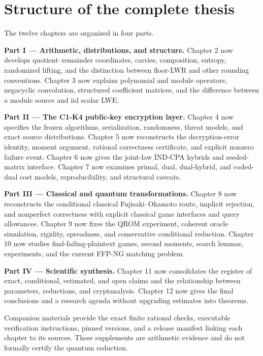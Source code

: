 \documentclass[
  11pt,
  a4paper,
  oneside]{report}
\begin{document}
\section{Structure of the complete
thesis}\label{structure-of-the-complete-thesis}

The twelve chapters are organized in four parts.

\textbf{Part I --- Arithmetic, distributions, and structure.} Chapter 2
now develops quotient--remainder coordinates, carries, composition,
entropy, randomized lifting, and the distinction between floor-LWR and
other rounding conventions. Chapter 3 now explains polynomial and module
operators, negacyclic convolution, structured coefficient matrices, and
the difference between a module source and iid scalar LWE.

\textbf{Part II --- The C1-K4 public-key encryption layer.} Chapter 4
now specifies the frozen algorithms, serialization, randomness, threat
models, and exact source distributions. Chapter 5 now reconstructs the
decryption-error identity, moment argument, rational correctness
certificate, and explicit nonzero failure event. Chapter 6 now gives the
joint-law IND-CPA hybrids and seeded-matrix interface. Chapter 7 now
examines primal, dual, dual-hybrid, and coded-dual cost models,
reproducibility, and structural caveats.

\textbf{Part III --- Classical and quantum transformations.} Chapter 8
now reconstructs the conditional classical Fujisaki--Okamoto route,
implicit rejection, and nonperfect correctness with explicit classical
game interfaces and query allowances. Chapter 9 now fixes the QROM
experiment, coherent oracle simulation, rigidity, spreadness, and
conservative conditional reduction. Chapter 10 now studies
find-failing-plaintext games, second moments, search lemmas,
experiments, and the current FFP-NG matching problem.

\textbf{Part IV --- Scientific synthesis.} Chapter 11 now consolidates
the register of exact, conditional, estimated, and open claims and the
relationship between parameters, reductions, and cryptanalysis. Chapter
12 now gives the final conclusions and a research agenda without
upgrading estimates into theorems.

Companion materials provide the exact finite rational checks, executable
verification instructions, pinned versions, and a release manifest
linking each chapter to its sources. These supplements are arithmetic
evidence and do not formally certify the quantum reduction.
\end{document}
